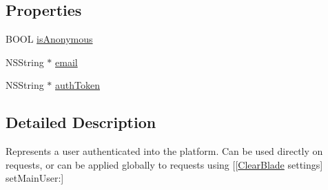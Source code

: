 \subsection*{Properties}
\begin{DoxyCompactItemize}
\item 
B\+O\+O\+L \hyperlink{interface_c_b_user_a50094838fe6cca3581124412ed588b51}{is\+Anonymous}
\item 
N\+S\+String $\ast$ \hyperlink{interface_c_b_user_a7907af25f66ea43d5b53ca0e70df34a2}{email}
\item 
N\+S\+String $\ast$ \hyperlink{interface_c_b_user_a942ca51689b5cfc7f8dc740f7543f54a}{auth\+Token}
\end{DoxyCompactItemize}


\subsection{Detailed Description}
Represents a user authenticated into the platform. Can be used directly on requests, or can be applied globally to requests using \mbox{[}\mbox{[}\hyperlink{interface_clear_blade}{Clear\+Blade} settings\mbox{]} set\+Main\+User\+:\mbox{]} 

